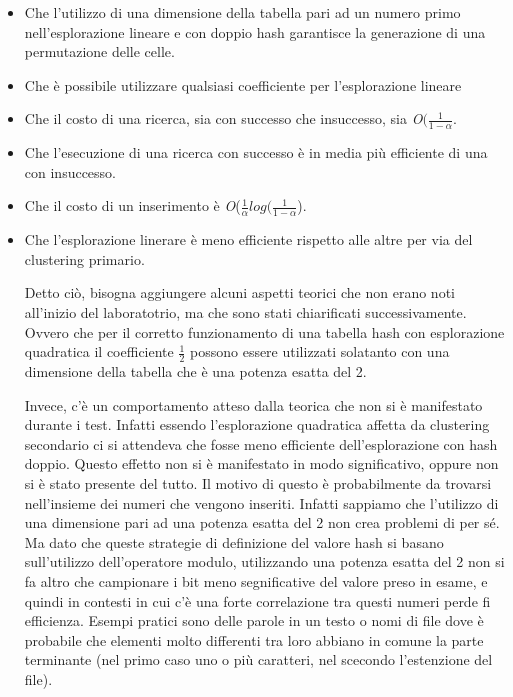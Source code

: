 \documentclass{article}
\newcommand{\bigO}{\emph{O}}
\begin{document}
\begin{itemize}
\item Che l'utilizzo di una dimensione della tabella pari ad un numero primo nell'esplorazione lineare e con doppio hash garantisce la generazione di una permutazione delle celle.
\item Che è possibile utilizzare qualsiasi coefficiente per l'esplorazione lineare
\item Che il costo di una ricerca, sia con successo che insuccesso, sia \bigO$(\frac{1}{1 - \alpha}$.
\item Che l'esecuzione di una ricerca con successo è in media più efficiente di una con insuccesso.
\item Che il costo di un inserimento è \bigO($\frac{1}{\alpha}log(\frac{1}{1 - \alpha}$).
\item Che l'esplorazione linerare è meno efficiente rispetto alle altre per via del clustering primario.

Detto ciò, bisogna aggiungere alcuni aspetti teorici che non erano noti all'inizio del laboratotrio, ma che sono stati chiarificati successivamente. Ovvero che per il corretto funzionamento di una tabella hash con esplorazione quadratica il coefficiente $\frac{1}{2}$ possono essere utilizzati solatanto con una dimensione della tabella che è una potenza esatta del 2.

Invece, c'è un comportamento atteso dalla teorica che non si è manifestato durante i test. Infatti essendo l'esplorazione quadratica affetta da clustering secondario ci si attendeva che fosse meno efficiente dell'esplorazione con hash doppio. Questo effetto non si è manifestato in modo significativo, oppure non si è stato presente del tutto. Il motivo di questo è probabilmente da trovarsi nell'insieme dei numeri che vengono inseriti. Infatti sappiamo che l'utilizzo di una dimensione pari ad una potenza esatta del 2 non crea problemi di per sé. Ma dato che queste strategie di definizione del valore hash si basano sull'utilizzo dell'operatore modulo, utilizzando una potenza esatta del 2 non si fa altro che campionare i bit meno segnificative del valore preso in esame, e quindi in contesti in cui c'è una forte correlazione tra questi numeri perde fi efficienza. Esempi pratici sono delle parole in un testo o nomi di file dove è probabile che elementi molto differenti tra loro abbiano in comune la parte terminante (nel primo caso uno o più caratteri, nel scecondo l'estenzione del file). 
\end{itemize}
\end{document}
